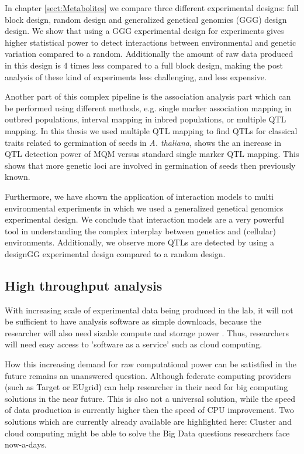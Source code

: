 In chapter \ref{sect:Metabolites} we compare three different experimental designs: full 
block design, random design and generalized genetical genomics (GGG) design design. We show 
that using a GGG experimental design for experiments gives higher statistical power to 
detect interactions between environmental and genetic variation compared to a random. 
Additionally the amount of raw data produced in this design is 4 times less compared to 
a full block design, making the post analysis of these kind of experiments less challenging, 
and less expensive.

Another part of this complex pipeline is the association analysis part which can be performed using 
different methods, e.g. single marker association mapping in outbred populations, interval 
mapping in inbred populations, or multiple QTL mapping. In this thesis we used multiple 
QTL mapping to find QTLs for classical traits related to germination of seeds in 
\emph{A. thaliana}, shows the an increase in QTL detection power of MQM versus standard 
single marker QTL mapping. This shows that more genetic loci are involved in germination 
of seeds then previously known.

Furthermore, we have shown the application of interaction models to multi environmental 
experiments in which we used a generalized genetical genomics experimental design. We 
conclude that interaction models are a very powerful tool in understanding the complex 
interplay between genetics and (cellular) environments. Additionally, we observe more QTLs 
are detected by using a designGG experimental design compared to a random design.

\subsection*{High throughput analysis}
With increasing scale of experimental data being produced in the lab, it will not be 
sufficient to have analysis software as simple downloads, because the researcher will 
also need sizable compute and storage power \cite{Schadt:2010}. Thus, researchers will 
need easy access to 'software as a service' such as cloud computing. 

How this increasing demand for raw computational power can be satistfied in the future remains 
an unanswered question. Although federate computing providers (such as Target or EUgrid) can help 
researcher in their need for big computing solutions in the near future. This is also not a 
universal solution, while the speed of data production is currently higher then the speed of 
CPU improvement. Two solutions which are currently already available are highlighted here: 
Cluster and cloud computing might be able to solve the Big Data questions researchers face 
now-a-days.

